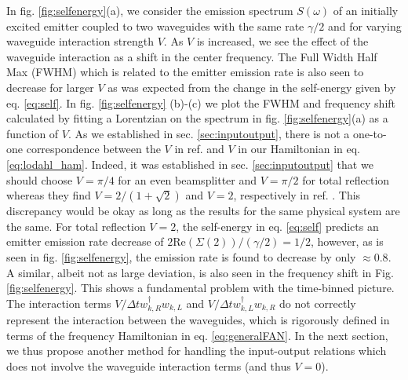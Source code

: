 In fig. \ref{fig:selfenergy}(a), we consider the emission spectrum $S(\omega)$ of an initially excited emitter coupled to two waveguides with the same rate $\gamma/2$ and for varying waveguide interaction strength $V$. As $V$ is increased, we see the effect of the waveguide interaction as a shift in the center frequency. The Full Width Half Max (FWHM) which is related to the emitter emission rate is also seen to decrease for larger $V$ as was expected from the change in the self-energy given by eq. \eqref{eq:self}. In fig. \ref{fig:selfenergy} (b)-(c) we plot the FWHM and frequency shift calculated by fitting a Lorentzian on the spectrum in fig. \ref{fig:selfenergy}(a) as a function of $V$. As we established in sec. \ref{sec:inputoutput}, there is not a one-to-one correspondence between the $V$ in ref. \cite{Xu2016FanoTransport} and $V$ in our Hamiltonian in eq. \eqref{eq:lodahl_ham}. Indeed, it was established in sec. \ref{sec:inputoutput} that we should choose $V = \pi/4$ for an even beamsplitter and $V = \pi/2$ for total reflection whereas they find $V=2/(1+\sqrt{2})$ and $V=2$, respectively in ref. \cite{Xu2016FanoTransport}. This discrepancy would be okay as long as the results for the same physical system are the same. For total reflection $V=2$, the self-energy in eq. \eqref{eq:self} predicts an emitter emission rate decrease of $2 \mathrm{Re}(\Sigma(2))/(\gamma/2) = 1/2$, however, as is seen in fig. \ref{fig:selfenergy}, the emission rate is found to decrease by only $\approx 0.8$. A similar, albeit not as large deviation, is also seen in the frequency shift in Fig. \ref{fig:selfenergy}. This shows a fundamental problem with the time-binned picture. The interaction terms $V/\Delta t w_{k,R}^\dagger w_{k,L}$ and $V/\Delta t w_{k,L}^\dagger w_{k,R}$ do not correctly represent the interaction between the waveguides, which is rigorously defined in terms of the frequency Hamiltonian in eq. \eqref{eq:generalFAN}. In the next section, we thus propose another method for handling the input-output relations which does not involve the waveguide interaction terms (and thus $V=0$).

